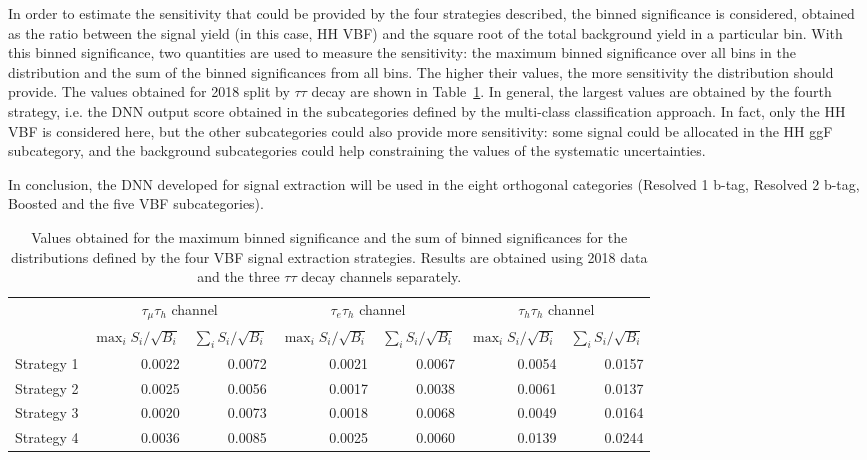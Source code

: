 \documentclass[../main.tex]{subfiles}
\begin{document}
In order to estimate the sensitivity that could be provided by the four strategies described, the binned significance is considered, obtained as the ratio between the signal yield (in this case, HH VBF) and the square root of the total background yield in a particular bin. With this binned significance, two quantities are used to measure the sensitivity: the maximum binned significance over all bins in the distribution and the sum of the binned significances from all bins. The higher their values, the more sensitivity the distribution should provide. The values obtained for 2018 split by $\tau\tau$ decay are shown in Table~\ref{hh:tab:vbf_sensitivity}. In general, the largest values are obtained by the fourth strategy, i.e. the DNN output score obtained in the subcategories defined by the multi-class classification approach. In fact, only the HH VBF is considered here, but the other subcategories could also provide more sensitivity: some signal could be allocated in the HH ggF subcategory, and the background subcategories could help constraining the values of the systematic uncertainties.

In conclusion, the DNN developed for signal extraction will be used in the eight orthogonal categories (Resolved 1 b-tag, Resolved 2 b-tag, Boosted and the five VBF subcategories).


\begin{table}[h!]
\begin{footnotesize}
\begin{tabular}{l|rr|rr|rr}
& \multicolumn{2}{c|}{$\tau_\mu\tau_h$ channel}
& \multicolumn{2}{c|}{$\tau_e\tau_h$ channel}
& \multicolumn{2}{c}{$\tau_h\tau_h$ channel}
\\
\cline{2-7}
& $\max_i S_i/\sqrt{B_i}$ & $\sum_i S_i/\sqrt{B_i}$
& $\max_i S_i/\sqrt{B_i}$ & $\sum_i S_i/\sqrt{B_i}$
& $\max_i S_i/\sqrt{B_i}$ & $\sum_i S_i/\sqrt{B_i}$ \\
\hline
Strategy 1 & 0.0022 & 0.0072 & 0.0021 & 0.0067 & 0.0054 & 0.0157 \\
Strategy 2 & 0.0025 & 0.0056 & 0.0017 & 0.0038 & 0.0061 & 0.0137 \\
Strategy 3 & 0.0020 & 0.0073 & 0.0018 & 0.0068 & 0.0049 & 0.0164 \\
Strategy 4 & 0.0036 & 0.0085 & 0.0025 & 0.0060 & 0.0139 & 0.0244
\end{tabular}
\end{footnotesize}
\caption[Maximum binned significance results for VBF signal extraction]{Values obtained for the maximum binned significance and the sum of binned significances for the distributions defined by the four VBF signal extraction strategies. Results are obtained using 2018 data and the three $\tau\tau$ decay channels separately.}
\label{hh:tab:vbf_sensitivity}
\end{table}
\end{document}
